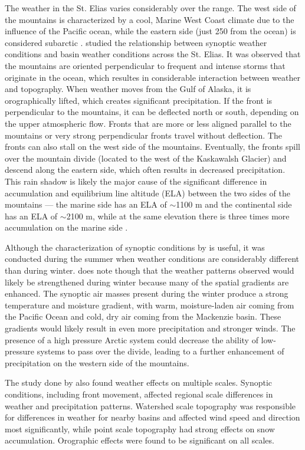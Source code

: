 \documentclass{sfuthesis}
\begin{document}
The weather in the St. Elias varies considerably over the range. The west side of the mountains is characterized by a cool, Marine West Coast climate due to the influence of the Pacific ocean, while the eastern side (just 250 from the ocean) is considered subarctic \citep{Marcus1970}. \cite{Taylor1969} studied the relationship between synoptic weather conditions and basin weather conditions across the St. Elias. It was observed that the mountains are oriented perpendicular to frequent and intense storms that originate in the ocean, which resultes in considerable interaction between weather and topography. When weather moves from the Gulf of Alaska, it is orographically lifted, which creates significant precipitation. If the front is perpendicular to the mountains, it can be deflected north or south, depending on the upper atmospheric flow. Fronts that are more or less aligned parallel to the mountains or very strong perpendicular fronts travel without deflection. The fronts can also stall on the west side of the mountains. Eventually, the fronts spill over the mountain divide (located to the west of the Kaskawalsh Glacier) and descend along the eastern side, which often results in decreased precipitation. This rain shadow is likely the major cause of the significant difference in accumulation and equilibrium line altitude (ELA) between the two sides of the mountains --- the marine side has an ELA of $\sim$1100 m and the continental side has an ELA of $\sim$2100 m, while at the same elevation there is three times more accumulation on the marine side \citep{Marcus1970}.

Although the characterization of synoptic conditions by \cite{Taylor1969} is useful, it was conducted during the summer when weather conditions are considerably different than during winter. \cite{Taylor1969} does note though that the weather patterns observed would likely be strengthened during winter because many of the spatial gradients are enhanced. The synoptic air masses present during the winter produce a strong temperature and moisture gradient, with warm, moisture-laden air coming from the Pacific Ocean and cold, dry air coming from the Mackenzie basin. These gradients would likely result in even more precipitation and stronger winds. The presence of a high pressure Arctic system could decrease the ability of low-pressure systems to pass over the divide, leading to a further enhancement of precipitation on the western side of the mountains. 

The study done by \cite{Taylor1969} also found weather effects on multiple scales. Synoptic conditions, including front movement, affected regional scale differences in weather and precipitation patterns. Watershed scale topography was responsible for differences in weather for nearby basins and affected wind speed and direction most significantly, while point scale topography had strong effects on snow accumulation. Orographic effects were found to be significant on all scales. 
\end{document}
